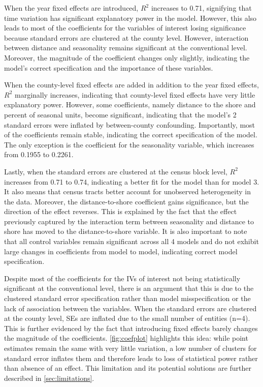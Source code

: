 \documentclass[11pt]{article}
\begin{document}
When the year fixed effects are introduced, $R^2$ increases to 0.71, signifying that time variation has significant explanatory power in the model. However, this also leads to most of the coefficients for the variables of interest losing significance because standard errors are clustered at the county level. However, interaction between distance and seasonality remains significant at the conventional level. Moreover, the magnitude of the coefficient changes only slightly, indicating the model's correct specification and the importance of these variables. 

When the county-level fixed effects are added in addition to the year fixed effects, $R^2$ marginally increases, indicating that county-level fixed effects have very little explanatory power. However, some coefficients, namely distance to the shore and percent of seasonal units, become significant, indicating that the model's 2 standard errors were inflated by between-county confounding. Importantly, most of the coefficients remain stable, indicating the correct specification of the model. The only exception is the coefficient for the seasonality variable, which increases from 0.1955 to 0.2261. 

Lastly, when the standard errors are clustered at the census block level, $R^2$ increases from 0.71 to 0.74, indicating a better fit for the model than for model 3. It also means that census tracts better account for unobserved heterogeneity in the data. Moreover, the distance-to-shore coefficient gains significance, but the direction of the effect reverses. This is explained by the fact that the effect previously captured by the interaction term between seasonality and distance to shore has moved to the distance-to-shore variable. It is also important to note that all control variables remain significant across all 4 models and do not exhibit large changes in coefficients from model to model, indicating correct model specification.

Despite most of the coefficients for the IVs of interest not being statistically significant at the conventional level, there is an argument that this is due to the clustered standard error specification rather than model misspecification or the lack of association between the variables. When the standard errors are clustered at the county level, SEs are inflated due to the small number of entities (n=4). This is further evidenced by the fact that introducing fixed effects barely changes the magnitude of the coefficients. \autoref{fig:coefplot} highlights this idea: while point estimates remain the same with very little variation, a low number of clusters for standard error inflates them and therefore leads to loss of statistical power rather than absence of an effect. This limitation and its potential solutions are further described in \autoref{sec:limitations}.
\end{document}
